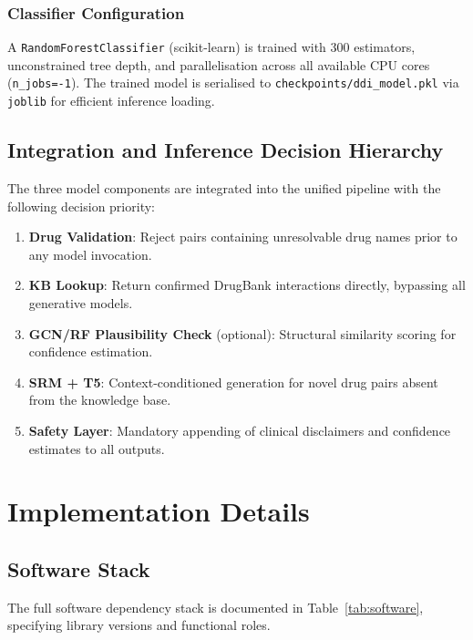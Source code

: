\documentclass[12pt,a4paper,oneside]{report}
\begin{document}
\subsection{Classifier Configuration}

A \texttt{RandomForestClassifier} (scikit-learn) is trained with 300 estimators,
unconstrained tree depth, and parallelisation across all available CPU cores
(\texttt{n\_jobs=-1}). The trained model is serialised to
\texttt{checkpoints/ddi\_model.pkl} via \texttt{joblib} for efficient inference loading.

\section{Integration and Inference Decision Hierarchy}

The three model components are integrated into the unified pipeline with the following
decision priority:

\begin{enumerate}
  \item \textbf{Drug Validation}: Reject pairs containing unresolvable drug names prior to
  any model invocation.
  \item \textbf{KB Lookup}: Return confirmed DrugBank interactions directly, bypassing all
  generative models.
  \item \textbf{GCN/RF Plausibility Check} (optional): Structural similarity scoring for
  confidence estimation.
  \item \textbf{SRM + T5}: Context-conditioned generation for novel drug pairs absent from
  the knowledge base.
  \item \textbf{Safety Layer}: Mandatory appending of clinical disclaimers and confidence
  estimates to all outputs.
\end{enumerate}

\chapter{Implementation Details}
\label{chap:impl}

\section{Software Stack}

The full software dependency stack is documented in Table~\ref{tab:software}, specifying
library versions and functional roles.
\end{document}
